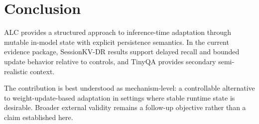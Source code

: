 \section{Conclusion}
ALC provides a structured approach to inference-time adaptation through mutable in-model state with explicit persistence semantics. In the current evidence package, SessionKV-DR results support delayed recall and bounded update behavior relative to controls, and TinyQA provides secondary semi-realistic context.

The contribution is best understood as mechanism-level: a controllable alternative to weight-update-based adaptation in settings where stable runtime state is desirable. Broader external validity remains a follow-up objective rather than a claim established here.
